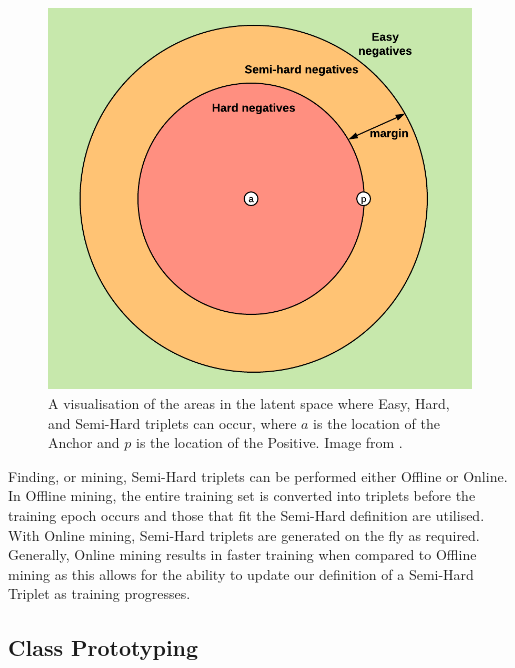 \begin{figure}
	\begin{center}
		\includegraphics[scale=0.7]{Chapter5/figs/semi-hard-triplet-mining.png}
	\end{center}
	\caption[A visualisation of the areas in the latent space where Easy, Hard, and Semi-Hard triplets can occur.]{A visualisation of the areas in the latent space where Easy, Hard, and Semi-Hard triplets can occur, where $a$ is the location of the Anchor and $p$ is the location of the Positive. Image from \cite{moindrot_triplet_2018}.}
	\label{fig:semi-hard-triplet-mining}
\end{figure}

Finding, or mining, Semi-Hard triplets can be performed either Offline or Online. In Offline mining, the entire training set is converted into triplets before the training epoch occurs and those that fit the Semi-Hard definition are utilised. With Online mining, Semi-Hard triplets are generated on the fly as required. Generally, Online mining results in faster training when compared to Offline mining as this allows for the ability to update our definition of a Semi-Hard Triplet as training progresses.

\subsection{Class Prototyping}\label{ch:ID,sec:SNNBackground,sub:prototypes}

